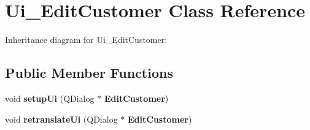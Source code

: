 \section{Ui\+\_\+\+Edit\+Customer Class Reference}
\label{class_ui___edit_customer}


Inheritance diagram for Ui\+\_\+\+Edit\+Customer\+:
\subsection*{Public Member Functions}
\begin{DoxyCompactItemize}
\item 
\mbox{\label{class_ui___edit_customer_a07d1f7eb14c944dec6942cf5fbb77078}} 
void {\bfseries setup\+Ui} (Q\+Dialog $\ast$\textbf{ Edit\+Customer})
\item 
\mbox{\label{class_ui___edit_customer_ae469fe6eb7a45a5c74f6f3bf1ffd2399}} 
void {\bfseries retranslate\+Ui} (Q\+Dialog $\ast$\textbf{ Edit\+Customer})
\end{DoxyCompactItemize}
